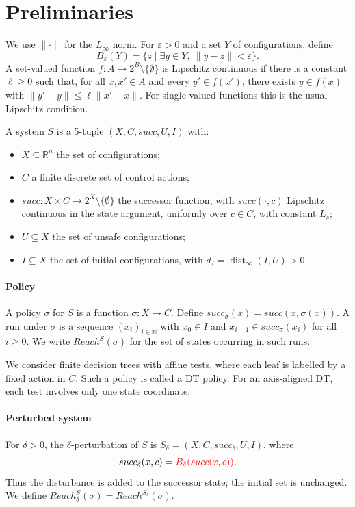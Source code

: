 \documentclass[runningheads]{llncs}
\begin{document}
\section{Preliminaries}

We use $\|\cdot\|$ for the $L_\infty$ norm. For $\varepsilon>0$ and a set $Y$ of configurations, define
\[
B_\varepsilon(Y)=\{z\mid \exists y\in Y,\ \|y-z\|<\varepsilon\}.
\]
A set-valued function $f:A\rightarrow 2^B\setminus\{\emptyset\}$ is Lipschitz continuous if there is a constant $\ell\geq0$ such that, {\color{red} for all $x,x'\in A$ and every $y'\in f(x')$, there exists $y\in f(x)$ with
$\|y'-y\|\leq\ell\|x'-x\|$.}
For single-valued functions this is the usual Lipschitz condition.

\begin{definition}
A system $S$ is a 5-tuple $(X,C,succ,U,I)$ with:
\begin{itemize}
\item $X\subseteq\mathbb{R}^n$ the set of configurations;
\item $C$ {\color{red} a finite discrete set of control actions};
\item $succ:X\times C\rightarrow 2^X\setminus\{\emptyset\}$ the successor function, {\color{red} with $succ(\cdot,c)$ Lipschitz continuous in the state argument, uniformly over $c\in C$, with constant $L_s$};
\item $U\subseteq X$ the set of unsafe configurations;
\item $I\subseteq X$ the set of initial configurations, with
$d_I=\operatorname{dist}_\infty(I,U)>0$.
\end{itemize}
\end{definition}

\paragraph{Policy}
A policy $\sigma$ for $S$ is a function $\sigma:X\rightarrow C$.
Define $succ_\sigma(x)=succ(x,\sigma(x))$.
A run under $\sigma$ is a sequence $(x_i)_{i\in\mathbb{N}}$ with $x_0\in I$ and $x_{i+1}\in succ_\sigma(x_i)$ for all $i\geq0$.
We write $Reach^S(\sigma)$ for the set of states occurring in such runs.

We consider finite decision trees with affine tests, where {\color{red} each leaf is labelled by a fixed action in $C$}. Such a policy is called a DT policy. For an axis-aligned DT, each test involves only one state coordinate.

\paragraph{Perturbed system}
\begin{definition}
For $\delta>0$, the $\delta$-perturbation of $S$ is
$S_\delta=(X,C,succ_\delta,U,I)$, where
\[
succ_\delta(x,c)={\color{red} B_\delta(succ(x,c))}.
\]
Thus the disturbance is added to the successor state; the initial set is unchanged.
We define $Reach^S_\delta(\sigma)=Reach^{S_\delta}(\sigma)$.
\end{definition}
\end{document}
